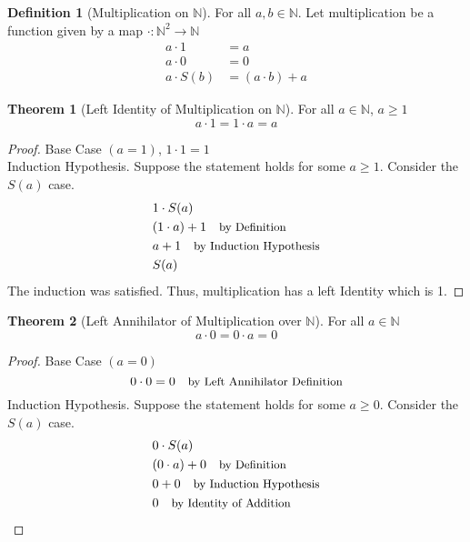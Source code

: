 \documentclass[12pt]{article}
\newcommand{\stext}[1]{\quad\text{\small #1}}
\theoremstyle{definition}
\newtheorem{theorem}{Theorem}
\newtheorem{definition}{Definition}
\begin{document}
\begin{definition}[Multiplication on $\mathbb{N}$] For all $a, b \in \mathbb{N}$. Let multiplication be a function given by a map $\cdot: \mathbb{N}^2 \to \mathbb{N}$
    \begin{align*}
        a \cdot 1 &= a \\
        a \cdot 0 &= 0 \\
        a \cdot S(b) &= (a \cdot b) + a
    \end{align*}
\end{definition}

\begin{theorem}[Left Identity of Multiplication on $\mathbb{N}$] For all $a \in \mathbb{N}$, $a \geq 1$
    \begin{equation*}
        a \cdot 1 = 1 \cdot a = a
    \end{equation*}
\end{theorem}
\begin{proof} Base Case $(a = 1)$, $1 \cdot 1 = 1$ \\
    Induction Hypothesis. Suppose the statement holds for some $a \geq 1$. Consider the $S(a)$ case.
    \begin{align*}
        & 1 \cdot S(a) \\ 
        & (1 \cdot a) + 1 \stext{by Definition} \\
        & a + 1 \stext{by Induction Hypothesis} \\
        & S(a)
    \end{align*}
    The induction was satisfied. Thus, multiplication has a left Identity which is 1.
\end{proof}

\begin{theorem}[Left Annihilator of Multiplication over $\mathbb{N}$] For all $a \in \mathbb{N}$
    \begin{equation*}
        a \cdot 0 = 0 \cdot a = 0
    \end{equation*}
\end{theorem}
\begin{proof}
    Base Case $(a = 0)$
    \begin{equation*}
        0 \cdot 0 = 0 \stext{by Left Annihilator Definition}
    \end{equation*}
    Induction Hypothesis. Suppose the statement holds for some $a \geq 0$. Consider the $S(a)$ case.
    \begin{align*}
        & 0 \cdot S(a) \\ 
        & (0 \cdot a) + 0 \stext{by Definition}\\
        & 0 + 0 \stext{by Induction Hypothesis}\\ 
        & 0 \stext{by Identity of Addition}
    \end{align*}
\end{proof}
\end{document}
